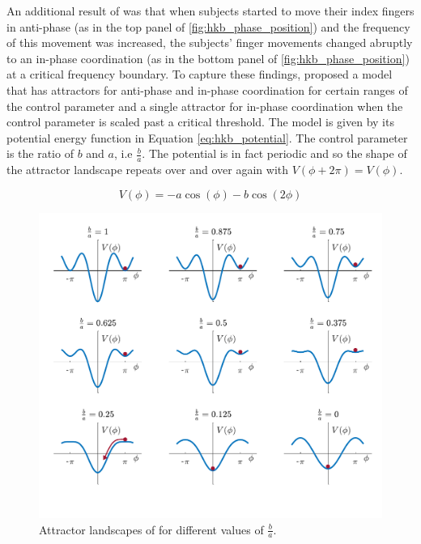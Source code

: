 An additional result of \citet{Kelso1981} was that when subjects started to move their index fingers in anti-phase (as in the top panel of \ref{fig:hkb_phase_position}) and the frequency of this movement was increased, the subjects' finger movements changed abruptly to an in-phase coordination (as in the bottom panel of \ref{fig:hkb_phase_position}) at a critical frequency boundary. To capture these findings, \citet{HakenKelsoBunz1985} proposed a model that has attractors for anti-phase and in-phase coordination for certain ranges of the control parameter and a single attractor for in-phase coordination when the control parameter is scaled past a critical threshold. The model is given by its potential energy function in Equation \ref{eq:hkb_potential}. The control parameter is the ratio of $b$ and $a$, i.e $\frac{b}{a}$. The potential is in fact periodic and so the shape of the attractor landscape repeats over and over again with $V(\phi + 2\pi) = V(\phi)$. 

\begin{equation}
V(\phi) = -a \cos(\phi) - b \cos( 2 \phi)
\label{eq:hkb_potential}
\end{equation}

\begin{figure}[b]
	\includegraphics[width=\textwidth]{figures/ch3/hkb_potential.pdf}
	\caption{Attractor landscapes of \citet{HakenKelsoBunz1985} for different values of $\frac{b}{a}$.}
	\label{fig:hkb_landscapes}
	
\end{figure}

